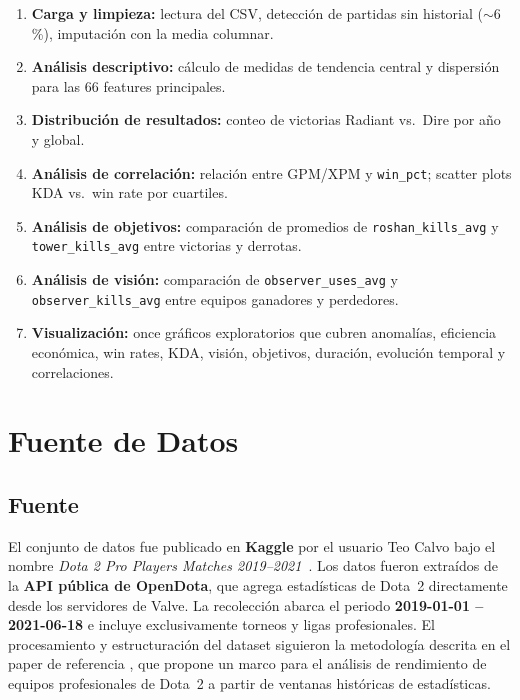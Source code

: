 \documentclass[12pt,a4paper]{article}
\begin{document}
\begin{enumerate}
  \item \textbf{Carga y limpieza:} lectura del CSV, detecci\'on de partidas sin
        historial ($\sim$6\,\%), imputaci\'on con la media columnar.
  \item \textbf{An\'alisis descriptivo:} c\'alculo de medidas de tendencia central
        y dispersi\'on para las 66 features principales.
  \item \textbf{Distribuci\'on de resultados:} conteo de victorias Radiant vs.\ Dire
        por a\~no y global.
  \item \textbf{An\'alisis de correlaci\'on:} relaci\'on entre GPM/XPM y
        \texttt{win\_pct}; scatter plots KDA vs.\ win rate por cuartiles.
  \item \textbf{An\'alisis de objetivos:} comparaci\'on de promedios de
        \texttt{roshan\_kills\_avg} y \texttt{tower\_kills\_avg} entre victorias y
        derrotas.
  \item \textbf{An\'alisis de visi\'on:} comparaci\'on de \texttt{observer\_uses\_avg}
        y \texttt{observer\_kills\_avg} entre equipos ganadores y perdedores.
  \item \textbf{Visualizaci\'on:} once gr\'aficos exploratorios que cubren anomal\'ias,
        eficiencia econ\'omica, win rates, KDA, visi\'on, objetivos, duraci\'on,
        evoluci\'on temporal y correlaciones.
\end{enumerate}

\section{Fuente de Datos}

\subsection{Fuente}

El conjunto de datos fue publicado en \textbf{Kaggle} por el usuario Teo Calvo
bajo el nombre \textit{Dota 2 Pro Players Matches 2019--2021}~\cite{kaggle2021}.
Los datos fueron extra\'idos de la \textbf{API p\'ublica de OpenDota}, que agrega
estad\'isticas de Dota~2 directamente desde los servidores de Valve. La
recolecci\'on abarca el periodo \textbf{2019-01-01 -- 2021-06-18} e incluye
exclusivamente torneos y ligas profesionales. El procesamiento y estructuraci\'on
del dataset siguieron la metodolog\'ia descrita en el paper de referencia
\cite{paper2021}, que propone un marco para el an\'alisis de rendimiento de equipos
profesionales de Dota~2 a partir de ventanas hist\'oricas de estad\'isticas.
\end{document}

